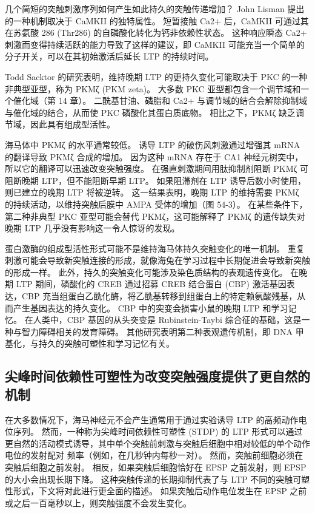 几个简短的突触刺激序列如何产生如此持久的突触传递增加？ John Lisman 提出的一种机制取决于 CaMKII 的独特属性。 短暂接触 Ca2+ 后，CaMKII 可通过其在苏氨酸 286 (Thr286) 的自磷酸化转化为钙非依赖性状态。 这种响应瞬态 Ca2+ 刺激而变得持续活跃的能力导致了这样的建议，即 CaMKII 可能充当一个简单的分子开关，可以在其初始激活后延长 LTP 的持续时间。

Todd Sacktor 的研究表明，维持晚期 LTP 的更持久变化可能取决于 PKC 的一种非典型亚型，称为 PKMζ (PKM zeta)。 大多数 PKC 亚型都包含一个调节域和一个催化域（第 14 章）。 二酰基甘油、磷脂和 Ca2+ 与调节域的结合会解除抑制域与催化域的结合，从而使 PKC 磷酸化其蛋白质底物。 相比之下，PKMζ 缺乏调节域，因此具有组成型活性。

海马体中 PKMζ 的水平通常较低。 诱导 LTP 的破伤风刺激通过增强其 mRNA 的翻译导致 PKMζ 合成的增加。 因为这种 mRNA 存在于 CA1 神经元树突中，所以它的翻译可以迅速改变突触强度。 在强直刺激期间用肽抑制剂阻断 PKMζ 可阻断晚期 LTP，但不能阻断早期 LTP。 如果阻滞剂在 LTP 诱导后数小时使用，则已建立的晚期 LTP 将被逆转。 这一结果表明，晚期 LTP 的维持需要 PKMζ 的持续活动，以维持突触后膜中 AMPA 受体的增加（图 54-3）。 在某些条件下，第二种非典型 PKC 亚型可能会替代 PKMζ，这可能解释了 PKMζ 的遗传缺失对晚期 LTP 几乎没有影响这一令人惊讶的发现。

蛋白激酶的组成型活性形式可能不是维持海马体持久突触变化的唯一机制。 重复刺激可能会导致新突触连接的形成，就像海兔在学习过程中长期促进会导致新突触的形成一样。 此外，持久的突触变化可能涉及染色质结构的表观遗传变化。 在晚期 LTP 期间，磷酸化的 CREB 通过招募 CREB 结合蛋白 (CBP) 激活基因表达，CBP 充当组蛋白乙酰化酶，将乙酰基转移到组蛋白上的特定赖氨酸残基，从而产生基因表达的持久变化。 CBP 中的突变会损害小鼠的晚期 LTP 和学习记忆。 在人类中，CBP 基因的从头突变是 Rubinstein-Taybi 综合征的基础，这是一种与智力障碍相关的发育障碍。 其他研究表明第二种表观遗传机制，即 DNA 甲基化，与持久的突触可塑性和学习记忆有关。

\subsection{尖峰时间依赖性可塑性为改变突触强度提供了更自然的机制}
在大多数情况下，海马神经元不会产生通常用于通过实验诱导 LTP 的高频动作电位序列。 然而，一种称为尖峰时间依赖性可塑性 (STDP) 的 LTP 形式可以通过更自然的活动模式诱导，其中单个突触前刺激与突触后细胞中相对较低的单个动作电位的发射配对 频率（例如，在几秒钟内每秒一对）。 然而，突触前细胞必须在突触后细胞之前发射。 相反，如果突触后细胞恰好在 EPSP 之前发射，则 EPSP 的大小会出现长期下降。 这种突触传递的长期抑制代表了与 LTP 不同的突触可塑性形式，下文将对此进行更全面的描述。 如果突触后动作电位发生在 EPSP 之前或之后一百毫秒以上，则突触强度不会发生变化。

